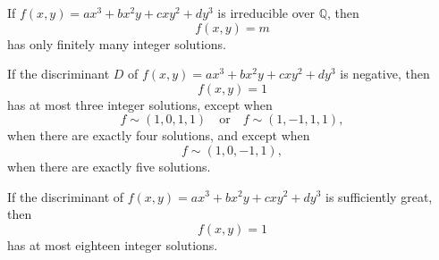 \begin{proposition}
    If $f(x,y)=ax^3+bx^2y+cxy^2+dy^3$ is irreducible over $\mathbb{Q}$, then
\[
    f(x,y)=m
\]
    has only finitely many integer solutions.
\end{proposition}

\begin{proposition}
    If the discriminant $D$ of $f(x,y)=ax^3+bx^2y+cxy^2+dy^3$ is negative, then
\[
    f(x,y)=1
\]
    has at most three integer solutions, except when
\[
    f\sim(1,0,1,1)\quad\text{or}\quad f\sim(1,-1,1,1),
\]
    when there are exactly four solutions, and except when
\[
    f\sim(1,0,-1,1),
\]
    when there are exactly five solutions.
\end{proposition}

\begin{proposition}
    If the discriminant of $f(x,y)=ax^3+bx^2y+cxy^2+dy^3$ is sufficiently great, then
\[
    f(x,y)=1
\]
    has at most eighteen integer solutions.
\end{proposition}

